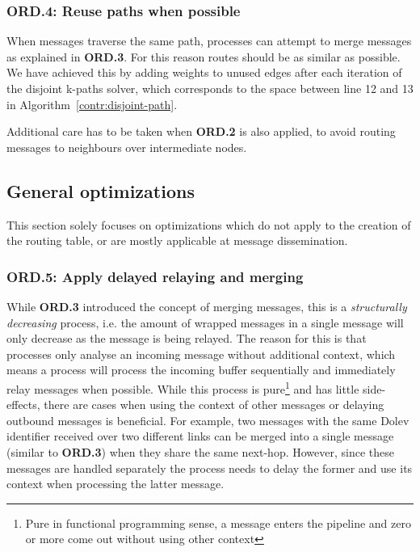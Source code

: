 \subsubsection{ORD.4: Reuse paths when possible}
When messages traverse the same path, processes can attempt to merge messages as explained in \textbf{ORD.3}. For this reason routes should be as similar as possible. We have achieved this  by adding weights to unused edges after each iteration of the disjoint k-paths solver, which corresponds to the space between line 12 and 13 in Algorithm~\ref{contr:disjoint-path}. 

Additional care has to be taken when \textbf{ORD.2} is also applied, to avoid routing messages to neighbours over intermediate nodes.

\subsection{General optimizations}
This section solely focuses on optimizations which do not apply to the creation of the routing table, or are mostly applicable at message dissemination.

\subsubsection{ORD.5: Apply delayed relaying and merging}
While \textbf{ORD.3} introduced the concept of merging messages, this is a \textit{structurally decreasing} process, i.e. the amount of wrapped messages in a single message will only decrease as the message is being relayed. The reason for this is that processes only analyse an incoming message without additional context, which means a process will process the incoming buffer sequentially and immediately relay messages when possible.
While this process is pure\footnote{Pure in functional programming sense, a message enters the pipeline and zero or more come out without using other context} 
and has little side-effects, there are cases when using the context of other messages or delaying outbound messages is beneficial. For example, two messages with the same Dolev identifier received over two different links can be merged into a single message (similar to \textbf{ORD.3}) when they share the same next-hop. However, since these messages are handled separately the process needs to delay the former and use its context when processing the latter message.

